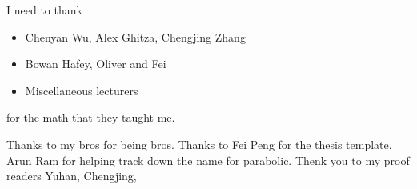 I need to thank
\begin{itemize}
	\item Chenyan Wu,  Alex Ghitza,  Chengjing Zhang	
	\item Bowan Hafey, Oliver and Fei
        \item Miscellaneous lecturers
\end{itemize}
for the math that they taught me. 

Thanks to my bros for being bros. Thanks to Fei Peng for the thesis template. Arun Ram for helping track down the name for parabolic. Thenk you to my proof readers Yuhan, Chengjing, 

